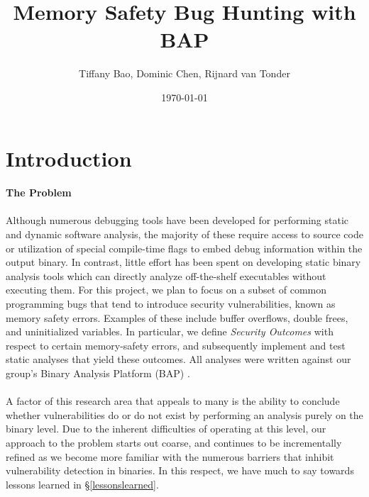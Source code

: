 \documentclass[letterpaper,11pt]{article}
\begin{document}
\date{\today}

\title{\Large \bf Memory Safety Bug Hunting with BAP}

\author{Tiffany Bao, Dominic Chen, Rijnard van Tonder}

\maketitle

\section{Introduction}
\label{intro}

\paragraph{The Problem}

\paragraph{}
Although numerous debugging tools have been developed for performing static and
dynamic software analysis, the majority of these require access to source
code or utilization of special compile­-time flags to embed debug information
within the output binary. In contrast, little effort has been spent on
developing static binary analysis tools which can directly analyze
off­-the-­shelf executables without executing them. For this project, we plan to
focus on a subset of common programming bugs that tend to introduce security
vulnerabilities, known as memory­ safety errors. Examples of these include
buffer overflows, double frees, and uninitialized variables. In particular, we
define \emph{Security Outcomes} with respect to certain memory-safety errors,
and subsequently implement and test static analyses that yield these outcomes.
All analyses were written against our group's Binary Analysis Platform
(BAP) \cite{bap, brumley2011bap}.

\paragraph{}
A factor of this research area that appeals to many is the ability to
conclude whether vulnerabilities do or do not exist by performing
an analysis purely on the binary level. Due to the inherent difficulties
of operating at this level, %
our approach to the problem starts out coarse, and continues to be
incrementally refined as we become more familiar with the numerous
barriers that inhibit vulnerability detection in binaries. In this respect,
we have much to say towards lessons learned in \S\ref{lessonslearned}.
\end{document}
